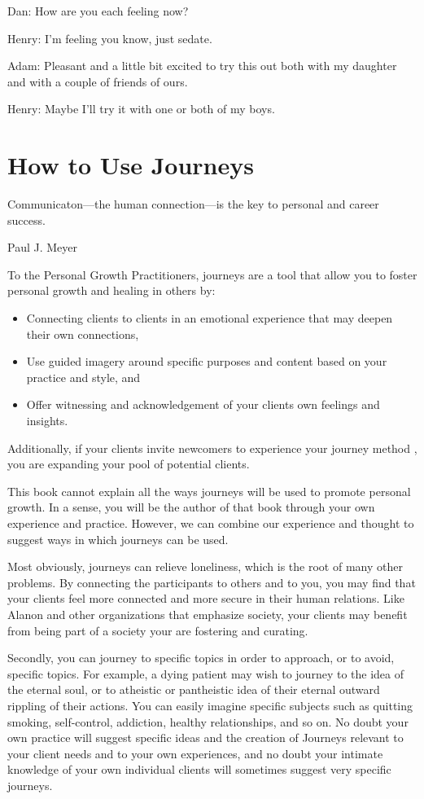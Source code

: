 \documentclass[12pt]{book}
\begin{document}
Dan: How are you each feeling now?

Henry: I'm feeling you know, just sedate.

Adam: Pleasant and a little bit excited to try this out both with my daughter and with a couple of friends of ours.

Henry: Maybe I'll try it with one or both of my boys.

\hrulefill


\chapter{How to Use Journeys}

\epigraph{Communicaton---the human connection---is the key to personal and career success.}{Paul J. Meyer}


To the Personal Growth Practitioners, journeys are a tool that allow
you to foster personal growth and healing in others by:

\begin{itemize}
\item Connecting clients to clients in an emotional experience that
  may deepen their own connections,
\item Use guided imagery around specific purposes and content based on
  your practice and style, and
\item Offer witnessing and acknowledgement of your clients own
  feelings and insights.
  \end{itemize}

Additionally, if your clients invite newcomers to experience your
journey method , you are expanding your pool of potential clients.

This book cannot explain all the ways journeys will be used to promote
personal growth. In a sense, you will be the author of that book
through your own experience and practice. However, we can combine our
experience and thought to suggest ways in which journeys can be used.

Most obviously, journeys can relieve loneliness, which is the root of
many other problems. By connecting the participants to others and to
you, you may find \cite{maldives} that your clients feel more
connected and more secure in their human relations. Like Alanon and
other organizations that emphasize society, your clients may benefit
from being part of a society your are fostering and curating.

Secondly, you can journey to specific topics in order to approach, or
to avoid, specific topics. For example, a dying patient may wish to
journey to the idea of the eternal soul, or to atheistic or
pantheistic idea of their eternal outward rippling of their
actions. You can easily imagine specific subjects such as
quitting smoking, self-control, addiction, healthy relationships, and
so on. No doubt your own practice will suggest specific ideas and the
creation of Journeys relevant to your client needs and to your own
experiences, and no doubt your intimate knowledge of your own
individual clients will sometimes suggest very specific journeys.
\end{document}
